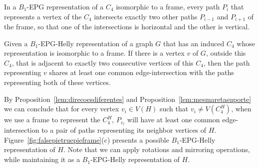 \documentclass[runningheads]{llncs}
\begin{document}

\begin{proposition}\label{lem:direcoesdiferentes}
In a $B_1$-EPG representation of a $C_4$ isomorphic to a frame, every path $P_i$ that represents a vertex of the $C_4$ intersects exactly two other paths $P_{i-1}$ and $P_{i+1}$ of the frame, so that one of the intersections is horizontal and the other is vertical. %
\end{proposition}


\begin{proposition}\label{lem:mesmaretasuporte}
Given a $B_1$-EPG-Helly representation of a graph $G$ that has an induced $C_4$ whose representation is isomorphic to a frame. If there is a vertex $v$ of $G$, outside this $C_4$, that is adjacent to exactly two consecutive vertices of this $C_4$, then the path representing $v$ shares at least one common edge-intersection with the paths representing both of these vertices.%
\end{proposition}



By Proposition~\ref{lem:direcoesdiferentes} and Proposition~\ref{lem:mesmaretasuporte} we can conclude that for every vertex $v_i \in V(H)$ such that $v_i \neq V(C_4^{H})$, when we use a frame to represent the $C_4^{H}$, $P_{v_i}$ will have at least one common edge-intersection to a pair of paths representing its neighbor vertices of $H$. 
Figure~\ref{fig:falsepietruepieframe}(c) presents a possible $B_{1}$-EPG-Helly representation of $H$. 
Note that we can apply rotations and mirroring operations, while maintaining it as a $B_1$-EPG-Helly representation of $H$.
\end{document}
